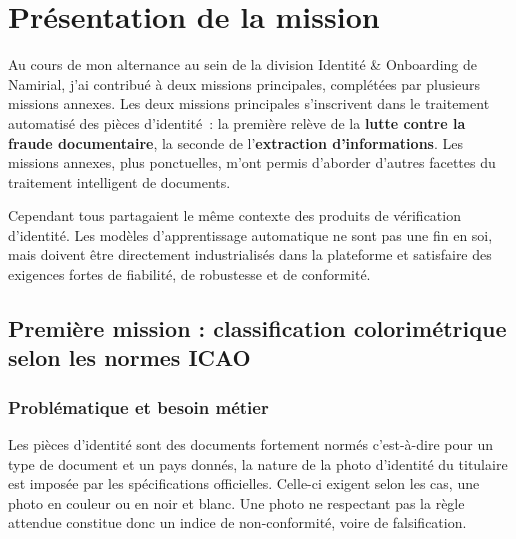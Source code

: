 \chapter{Présentation de la mission}\label{ch:mission}


Au cours de mon alternance au sein de la division Identité \& Onboarding de
Namirial, j'ai contribué à deux missions principales, complétées par plusieurs
missions annexes. Les deux missions principales s'inscrivent dans le traitement
automatisé des pièces d'identité~: la première relève de la \textbf{lutte contre la
fraude documentaire}, la seconde de l'\textbf{extraction d'informations}. Les
missions annexes, plus ponctuelles, m'ont permis d'aborder d'autres facettes du
traitement intelligent de documents.

Cependant tous partagaient le même contexte des produits de vérification d'identité. Les modèles d'apprentissage automatique ne sont
pas une fin en soi, mais doivent être directement industrialisés dans la plateforme
et satisfaire des exigences fortes de fiabilité, de robustesse et de conformité.

\section{Première mission : classification colorimétrique selon les normes ICAO}

\subsection{Problématique et besoin métier}

Les pièces d'identité sont des documents fortement normés c'est-à-dire pour un type de document
et un pays donnés, la nature de la photo d'identité du titulaire est imposée par les
spécifications officielles. Celle-ci exigent selon les cas, une photo en couleur ou
en noir et blanc. Une photo ne respectant pas la règle attendue constitue
donc un indice de non-conformité, voire de falsification.


